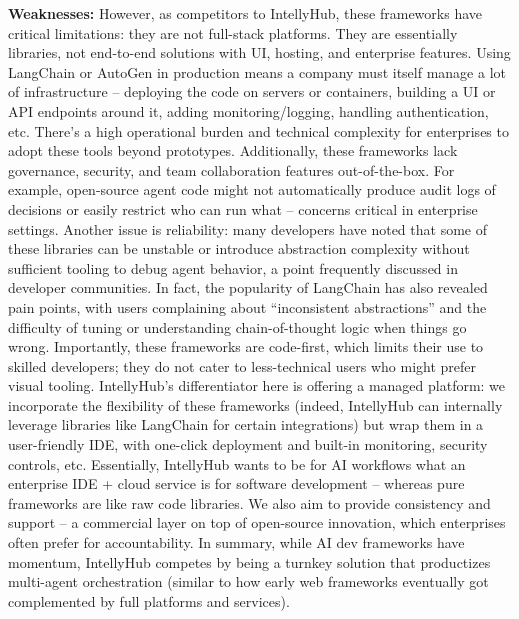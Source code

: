 \textbf{Weaknesses:} However, as competitors to IntellyHub, these frameworks have critical limitations: they are not full-stack platforms. They are essentially libraries, not end-to-end solutions with UI, hosting, and enterprise features. Using LangChain or AutoGen in production means a company must itself manage a lot of infrastructure – deploying the code on servers or containers, building a UI or API endpoints around it, adding monitoring/logging, handling authentication, etc. There's a high operational burden and technical complexity for enterprises to adopt these tools beyond prototypes. Additionally, these frameworks lack governance, security, and team collaboration features out-of-the-box. For example, open-source agent code might not automatically produce audit logs of decisions or easily restrict who can run what – concerns critical in enterprise settings. Another issue is reliability: many developers have noted that some of these libraries can be unstable or introduce abstraction complexity without sufficient tooling to debug agent behavior, a point frequently discussed in developer communities\cite{langchainCritique}. In fact, the popularity of LangChain has also revealed pain points, with users complaining about “inconsistent abstractions” and the difficulty of tuning or understanding chain-of-thought logic when things go wrong. Importantly, these frameworks are code-first, which limits their use to skilled developers; they do not cater to less-technical users who might prefer visual tooling. IntellyHub's differentiator here is offering a managed platform: we incorporate the flexibility of these frameworks (indeed, IntellyHub can internally leverage libraries like LangChain for certain integrations) but wrap them in a user-friendly IDE, with one-click deployment and built-in monitoring, security controls, etc. Essentially, IntellyHub wants to be for AI workflows what an enterprise IDE + cloud service is for software development – whereas pure frameworks are like raw code libraries. We also aim to provide consistency and support – a commercial layer on top of open-source innovation, which enterprises often prefer for accountability. In summary, while AI dev frameworks have momentum, IntellyHub competes by being a turnkey solution that productizes multi-agent orchestration (similar to how early web frameworks eventually got complemented by full platforms and services).

